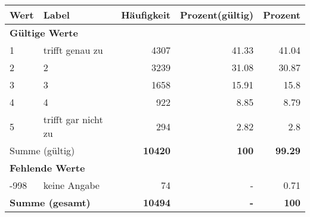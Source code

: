      \begin{longtable}{lXrrr}
     \toprule
     \textbf{Wert} & \textbf{Label} & \textbf{Häufigkeit} & \textbf{Prozent(gültig)} & \textbf{Prozent} \\
     \endhead
     \midrule
     \multicolumn{5}{l}{\textbf{Gültige Werte}}\\

     1 &
     \multicolumn{1}{X}{ trifft genau zu   } &


       \num{4307} &
       \num[round-mode=places,round-precision=2]{41.33} &
         \num[round-mode=places,round-precision=2]{41.04} \\

     2 &
     \multicolumn{1}{X}{ 2   } &


       \num{3239} &
       \num[round-mode=places,round-precision=2]{31.08} &
         \num[round-mode=places,round-precision=2]{30.87} \\

     3 &
     \multicolumn{1}{X}{ 3   } &


       \num{1658} &
       \num[round-mode=places,round-precision=2]{15.91} &
         \num[round-mode=places,round-precision=2]{15.8} \\

     4 &
     \multicolumn{1}{X}{ 4   } &


       \num{922} &
       \num[round-mode=places,round-precision=2]{8.85} &
         \num[round-mode=places,round-precision=2]{8.79} \\

     5 &
     \multicolumn{1}{X}{ trifft gar nicht zu   } &


       \num{294} &
       \num[round-mode=places,round-precision=2]{2.82} &
         \num[round-mode=places,round-precision=2]{2.8} \\
     \midrule
     \multicolumn{2}{l}{Summe (gültig)} &
       \textbf{\num{10420}} &
     \textbf{\num{100}} &
       \textbf{\num[round-mode=places,round-precision=2]{99.29}} \\
     \multicolumn{5}{l}{\textbf{Fehlende Werte}}\\
       -998 &
       keine Angabe &
         \num{74} &
        - &
         \num[round-mode=places,round-precision=2]{0.71} \\
     \midrule
     \multicolumn{2}{l}{\textbf{Summe (gesamt)}} &
          \textbf{\num{10494}} &
        \textbf{-} &
        \textbf{\num{100}} \\
     \bottomrule
     \end{longtable}
     
